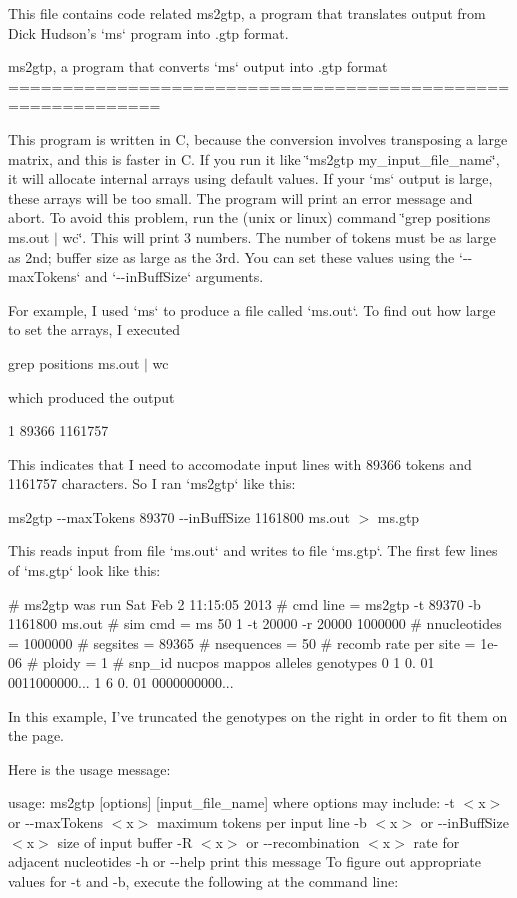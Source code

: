 \-This file contains code related ms2gtp, a program that translates output from \-Dick \-Hudson's `ms` program into .gtp format.

ms2gtp, a program that converts `ms` output into .gtp format ============================================================

\-This program is written in \-C, because the conversion involves transposing a large matrix, and this is faster in \-C. \-If you run it like \char`\"{}ms2gtp my\-\_\-input\-\_\-file\-\_\-name\char`\"{}, it will allocate internal arrays using default values. \-If your `ms` output is large, these arrays will be too small. \-The program will print an error message and abort. \-To avoid this problem, run the (unix or linux) command \char`\"{}grep positions
 ms.\-out $|$ wc\char`\"{}. \-This will print 3 numbers. \-The number of tokens must be as large as 2nd; buffer size as large as the 3rd. \-You can set these values using the `-\/-\/max\-Tokens` and `-\/-\/in\-Buff\-Size` arguments.

\-For example, \-I used `ms` to produce a file called `ms.out`. \-To find out how large to set the arrays, \-I executed

grep positions ms.\-out $|$ wc

which produced the output

1 89366 1161757

\-This indicates that \-I need to accomodate input lines with 89366 tokens and 1161757 characters. \-So \-I ran `ms2gtp` like this\-:

ms2gtp -\/-\/max\-Tokens 89370 -\/-\/in\-Buff\-Size 1161800 ms.\-out $>$ ms.\-gtp

\-This reads input from file `ms.out` and writes to file `ms.gtp`. \-The first few lines of `ms.gtp` look like this\-:

\# ms2gtp was run \-Sat \-Feb 2 11\-:15\-:05 2013 \# cmd line = ms2gtp -\/t 89370 -\/b 1161800 ms.\-out \# sim cmd = ms 50 1 -\/t 20000 -\/r 20000 1000000 \# nnucleotides = 1000000 \# segsites = 89365 \# nsequences = 50 \# recomb rate per site = 1e-\/06 \# ploidy = 1 \# snp\-\_\-id nucpos mappos alleles genotypes 0 1 0. 01 0011000000... 1 6 0. 01 0000000000...

\-In this example, \-I've truncated the genotypes on the right in order to fit them on the page.

\-Here is the usage message\-:

usage\-: ms2gtp \mbox{[}options\mbox{]} \mbox{[}input\-\_\-file\-\_\-name\mbox{]} where options may include\-: -\/t $<$x$>$ or -\/-\/max\-Tokens $<$x$>$ maximum tokens per input line -\/b $<$x$>$ or -\/-\/in\-Buff\-Size $<$x$>$ size of input buffer -\/\-R $<$x$>$ or -\/-\/recombination $<$x$>$ rate for adjacent nucleotides -\/h or -\/-\/help print this message \-To figure out appropriate values for -\/t and -\/b, execute the following at the command line\-:


